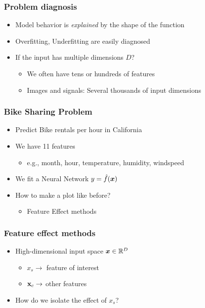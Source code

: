 \begin{frame}
  \frametitle{Problem diagnosis}

  \begin{itemize}
  \item Model behavior is \emph{explained} by the shape of the function
  \item Overfitting, Underfitting are easily diagnosed
  \item If the input has multiple dimensions $D$?
    \begin{itemize}
    \item We often have tens or hundreds of features
    \item Images and signals: Several thousands of input dimensions
    \end{itemize}
  \end{itemize}
\end{frame}



\begin{frame}
  \frametitle{Bike Sharing Problem}

  \begin{itemize}
  \item Predict Bike rentals per hour in California
  \item We have 11 features
    \begin{itemize}
    \item e.g., month, hour, temperature, humidity, windspeed
    \end{itemize}
  \item We fit a Neural Network \(y = \hat{f}(\boldsymbol{x})\)
  \item How to make a plot like before?
    \begin{itemize}
    \item Feature Effect methods
    \end{itemize}
  \end{itemize}
\end{frame}

\begin{frame}
  \frametitle{Feature effect methods}
  \begin{itemize}
  \item High-dimensional input space \(\boldsymbol{x} \in \mathbb{R}^D\)
    \begin{itemize}
    \item \(x_s \rightarrow \) feature of interest
    \item \(\mathbf{x}_c \rightarrow\) other features
    \end{itemize}
  \item How do we isolate the effect of \(x_s\)?
  \end{itemize}
\end{frame}


